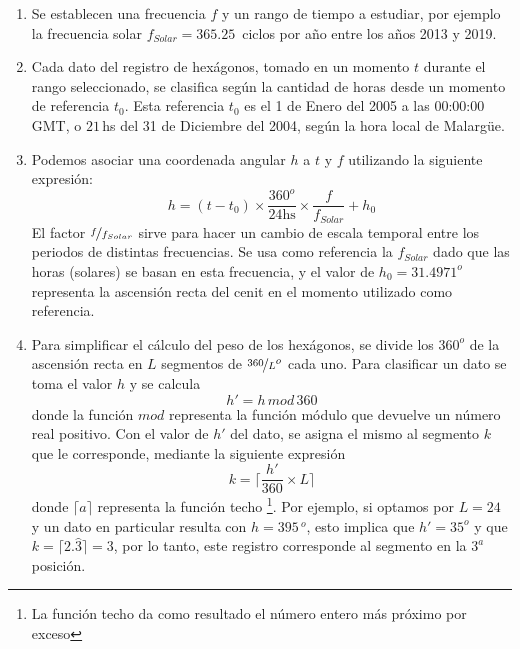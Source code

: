       \begin{enumerate}
        \item Se establecen una frecuencia $f$  y un rango de tiempo a estudiar, por ejemplo la frecuencia solar $f_{Solar}= 365.25\,$ ciclos por año entre los años 2013 y 2019. 

        \item Cada dato del registro de hexágonos, tomado en un momento $t$ durante el rango seleccionado, se clasifica según la cantidad de horas desde un momento de referencia $t_0$. Esta referencia $t_0$ es el 1 de Enero del 2005 a las 00:00:00 GMT, o  $21\,$hs del 31 de Diciembre del 2004, según la hora local de Malargüe.

        \item Podemos asociar una coordenada angular $h$ a $t$  y $f$  utilizando la siguiente expresión:
         \begin{equation}
          h = (t-t_0) \times \frac{360^o}{24\text{hs}} \times\frac{f}{f_{Solar}} + h_0
          \label{eq:h_horas} 
        \end{equation}
        El factor $\nicefrac{f}{f_{Solar}}$ sirve para hacer un cambio de escala temporal entre los periodos de distintas frecuencias. Se usa como referencia la $f_{Solar}$ dado que las horas (solares) se basan en esta frecuencia, y el valor de $h_0=31.4971^o$ representa la ascensión recta del cenit en el momento utilizado como referencia.
        
        \item  Para simplificar el cálculo del peso de los hexágonos, se divide los $360^o$ de la ascensión recta en $L$ segmentos de $\nicefrac{360}{L} ^o$ cada uno. Para clasificar un dato se  toma  el valor $h$  y se calcula
        \begin{equation}
          h' = h\, mod \,360 %
          \label{eq:h_primado}
        \end{equation}
        donde la función $mod$ representa la función módulo que devuelve un número real positivo. Con el valor de $h'$ del dato, se asigna el mismo al segmento $k$ que le corresponde, mediante la siguiente expresión
        \begin{equation}
          k = \bigg \lceil \frac{h'}{360}\times L \bigg \rceil
        \end{equation}
        donde $\lceil a \rceil$ representa la función techo \footnote{La función techo da como resultado el número entero más próximo por exceso}. Por ejemplo, si optamos por $L=24$ y un dato en particular resulta con  $h=395\,^o$, esto implica que $h'= 35^o$ y que $k=\lceil 2.\hat{3} \rceil=3$, por lo tanto, este registro corresponde al segmento en la $3^{a}$ posición.


\end{enumerate}
